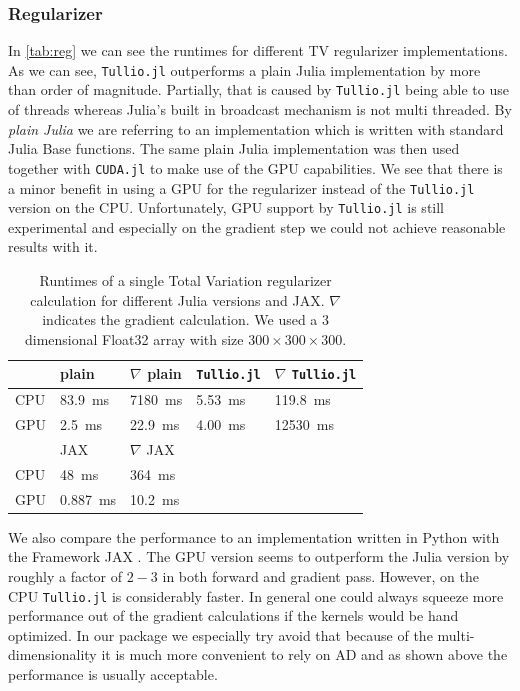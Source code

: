 \documentclass{juliacon}
\begin{document}
        \subsubsection{Regularizer}
            In \autoref{tab:reg} we can see the runtimes for different TV regularizer implementations. As we can see, \verb|Tullio.jl| outperforms a plain 
            Julia implementation by more than order of magnitude. Partially, that is caused by \verb|Tullio.jl|
            being able to 
            use of threads whereas Julia's built in broadcast mechanism is not multi threaded.
            By \textit{plain Julia} we are referring to an implementation which is written with standard Julia Base functions.
            The same plain Julia implementation was then used together with \verb|CUDA.jl|
            to make use of the GPU capabilities. We see that there is a minor benefit in using a GPU for the regularizer instead of 
            the \verb|Tullio.jl| version on the CPU. Unfortunately, GPU support by \verb|Tullio.jl| is still experimental and especially on the gradient step 
            we could not achieve reasonable results with it.
            \begin{table}[h]
                \begin{tabular}{l l l l l}
                    & plain & $\nabla$ plain & \verb|Tullio.jl| & $\nabla$ \verb|Tullio.jl| \\
                \hline
                CPU & \SI{83.9}{\milli\second} & \SI{7180}{\milli\second} & \SI{5.53}{\milli\second}  & \SI{119.8}{\milli\second}   \\ 
                GPU & \SI{2.5}{\milli\second}  & \SI{22.9}{\milli\second}& \SI{4.00}{\milli\second}  & \SI{12530}{\milli\second} \\
                \hline
                \hline
                    & JAX & $\nabla$ JAX && \\
                \hline
                CPU & \SI{48}{\milli\second}   & \SI{364}{\milli\second}&   & \\
                GPU & \SI{0.887}{\milli\second}   & \SI{10.2}{\milli\second}&   &
                \end{tabular}
                \caption{Runtimes of a single Total Variation regularizer calculation for different Julia versions and JAX. $\nabla$ indicates the gradient calculation. 
                    We used a 3 dimensional Float32 array with size $300 \times 300 \times 300$.  }
                \label{tab:reg}
            \end{table}
            We also compare the performance to an implementation written in Python with the Framework JAX \cite{jax2018github}. 
            The GPU version seems to outperform the Julia version by roughly a factor of $2 - 3$ in both forward and gradient pass.
            However, on the CPU \verb|Tullio.jl| is considerably faster. 
            In general one could always squeeze more performance out of the gradient calculations if the kernels would be hand optimized.
            In our package we especially try avoid that because of the multi-dimensionality it is much more convenient
            to rely on AD and as shown above the performance is usually acceptable.
\end{document}
